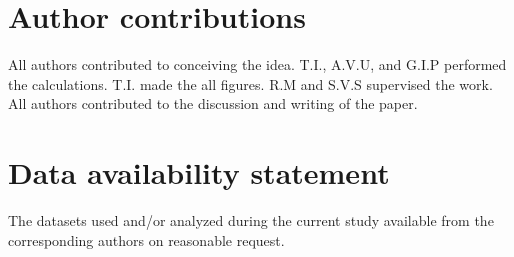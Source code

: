 \documentclass[aps,prb,groupedaddress,twocolumn,showpacs,dvipdfmx, superscriptaddress,pdftex]{revtex4-2}
\begin{document}
\section{Author contributions}
All authors contributed to conceiving the idea. T.I., A.V.U, and G.I.P performed the calculations. T.I. made the all figures. R.M and S.V.S supervised the work. All authors contributed to the discussion and writing of the paper.

\section{Data availability statement}
The datasets used and/or analyzed during the current study available from the corresponding authors on reasonable request.

 

\end{document}

